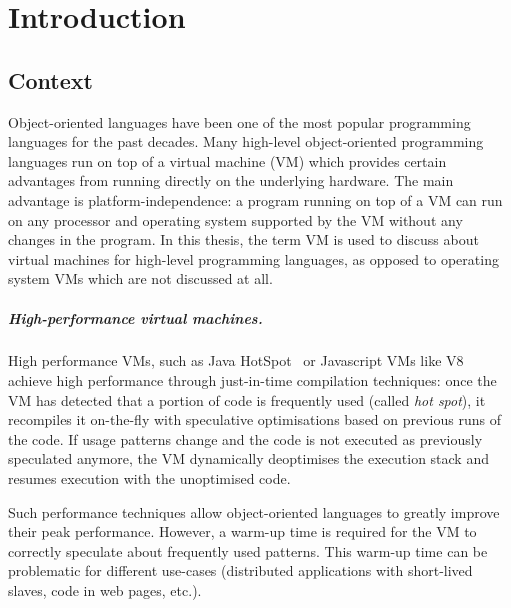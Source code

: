 \documentclass[a4paper,12pt,twoside]{../includes/ThesisStyle}
\begin{document}
\fi

\chapter{Introduction}
\label{chap:intro}
\minitoc

\section{Context}

Object-oriented languages have been one of the most popular programming languages for the past decades. Many high-level object-oriented programming languages run on top of a virtual machine (VM) which provides certain advantages from running directly on the underlying hardware. The main advantage is platform-independence: a program running on top of a VM can run on any processor and operating system supported by the VM without any changes in the program. In this thesis, the term VM is used to discuss about virtual machines for high-level programming languages, as opposed to operating system VMs which are not discussed at all.

\paragraph{High-performance virtual machines.}
High performance VMs, such as Java HotSpot~\cite{Pale01a} or Javascript VMs like V8~\cite{V8} achieve high performance through just-in-time compilation techniques: once the VM has detected that a portion of code is frequently used (called \emph{hot spot}), it recompiles it on-the-fly with speculative optimisations based on previous runs of the code. If usage patterns change and the code is not executed as previously speculated anymore, the VM dynamically deoptimises the execution stack and resumes execution with the unoptimised code.

Such performance techniques allow object-oriented languages to greatly improve their peak performance. However, a warm-up time is required for the VM to correctly speculate about frequently used patterns. This warm-up time can be problematic for different use-cases (distributed applications with short-lived slaves, code in web pages, etc.).
\end{document}
